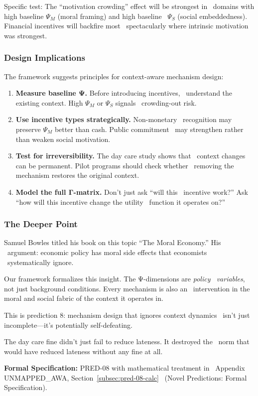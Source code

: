 Specific test: The ``motivation crowding'' effect will be strongest in \
domains with high baseline $\Psi_M$ (moral framing) and high baseline \
$\Psi_S$ (social embeddedness). Financial incentives will backfire most \
spectacularly where intrinsic motivation was strongest.

\subsubsection{Design Implications}

The framework suggests principles for context-aware mechanism design:

\begin{enumerate}
    \item \textbf{Measure baseline Ψ.} Before introducing incentives, \
    understand the existing context. High $\Psi_M$ or $\Psi_S$ signals \
    crowding-out risk.
    
    \item \textbf{Use incentive types strategically.} Non-monetary \
    recognition may preserve $\Psi_M$ better than cash. Public commitment \
    may strengthen rather than weaken social motivation.
    
    \item \textbf{Test for irreversibility.} The day care study shows that \
    context changes can be permanent. Pilot programs should check whether \
    removing the mechanism restores the original context.
    
    \item \textbf{Model the full Γ-matrix.} Don't just ask ``will this \
    incentive work?'' Ask ``how will this incentive change the utility \
    function it operates on?''
\end{enumerate}

\subsubsection{The Deeper Point}

Samuel Bowles titled his book on this topic ``The Moral Economy.'' His \
argument: economic policy has moral side effects that economists \
systematically ignore.

Our framework formalizes this insight. The Ψ-dimensions are \emph{policy \
variables}, not just background conditions. Every mechanism is also an \
intervention in the moral and social fabric of the context it operates in.

This is prediction 8: mechanism design that ignores context dynamics \
isn't just incomplete---it's potentially self-defeating.

The day care fine didn't just fail to reduce lateness. It destroyed the \
norm that would have reduced lateness without any fine at all.

\begin{cross-reference}
\textbf{Formal Specification:} PRED-08 with mathematical treatment in \
Appendix UNMAPPED_AWA, Section~\ref{subsec:pred-08-calc} \
(Novel Predictions: Formal Specification).
\end{cross-reference}
